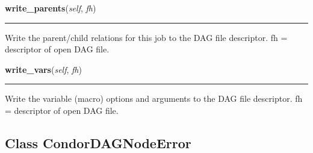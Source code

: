     \label{pipeline:CondorDAGNode:write_parents}
    \vspace{0.5ex}

    \noindent\begin{boxedminipage}{\textwidth}

    \raggedright \textbf{write\_parents}(\textit{self}, \textit{fh})

    \vspace{-1.5ex}

    \rule{\textwidth}{0.5\fboxrule}
    Write the parent/child relations for this job to the DAG file 
    descriptor. fh = descriptor of open DAG file.

    \vspace{1ex}

    \end{boxedminipage}

    \label{pipeline:CondorDAGNode:write_vars}
    \vspace{0.5ex}

    \noindent\begin{boxedminipage}{\textwidth}

    \raggedright \textbf{write\_vars}(\textit{self}, \textit{fh})

    \vspace{-1.5ex}

    \rule{\textwidth}{0.5\fboxrule}
    Write the variable (macro) options and arguments to the DAG file 
    descriptor. fh = descriptor of open DAG file.

    \vspace{1ex}

    \end{boxedminipage}



\subsection{Class CondorDAGNodeError}

